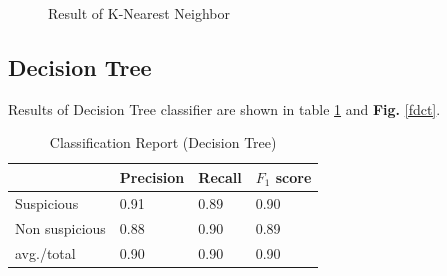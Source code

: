 \begin{figure}[H]
\centering
{}%
\hfill %
%
\caption{Result of K-Nearest Neighbor}
\label{fknn}
\end{figure}

\subsection{\textbf{Decision Tree}}

Results of Decision Tree classifier are shown in table \ref{tdct} and \textbf{Fig.} \ref{fdct}.

\begin{table}[h!]
\begin{center}
\caption{Classification Report (Decision Tree)}
\begin{tabular}{|m{2.8cm} | m{1.5cm}| m{1.3cm}| m{1.5cm}|}
\hline
     & Precision & Recall & $F_1$ score\\
\hline
     Suspicious & 0.91 & 0.89 & 0.90\\
\hline 
     Non suspicious  & 0.88 & 0.90 & 0.89\\
\hline 
     avg./total & 0.90 & 0.90 & 0.90\\
\hline
\end{tabular}
\label{tdct}
\end{center}
\end{table}

